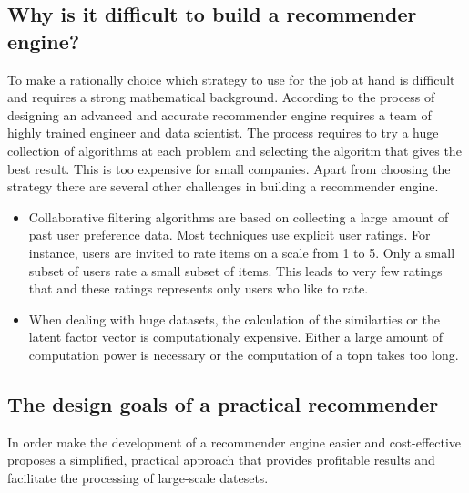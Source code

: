 \subsection{Why is it difficult to build a recommender engine?}

To make a rationally choice which strategy to use for the job at hand is difficult and requires a strong mathematical background. According to  \cite{Dunning14} the process of designing an advanced and accurate recommender engine requires a team of highly trained engineer and data scientist. The process requires to try a huge collection of algorithms at each problem and selecting the algoritm that gives the best result. This is too expensive for small companies. Apart from choosing the strategy there are several other challenges in building a recommender engine.

\begin{itemize}
\item Collaborative filtering algorithms are based on collecting a large amount of past user preference data. Most techniques use explicit user ratings. For instance, users are invited to rate items on a scale from 1 to 5. Only a small subset of users rate a small subset of items. This leads to very few ratings that and these ratings represents only users who like to rate.

\item When dealing with huge datasets, the calculation of the similarties or the latent factor vector is computationaly expensive. Either a large amount of computation power is necessary or the computation of a \gls{topn} takes too long.
\end{itemize}

\subsection{The design goals of a practical recommender}
\label{sec:practical}

In order make the development of a recommender engine easier and cost-effective \cite{Dunning14} proposes a simplified, practical approach that provides profitable results and facilitate the processing of large-scale datesets. 

